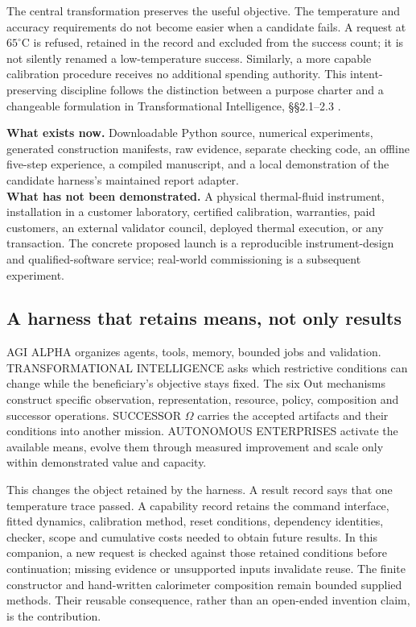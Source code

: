 \documentclass[11pt,letterpaper]{article}
\begin{document}
The central transformation preserves the useful objective. The temperature and accuracy requirements do not become easier when a candidate fails. A request at $65^{\circ}\mathrm C$ is refused, retained in the record and excluded from the success count; it is not silently renamed a low-temperature success. Similarly, a more capable calibration procedure receives no additional spending authority. This intent-preserving discipline follows the distinction between a purpose charter and a changeable formulation in Transformational Intelligence, \S\S2.1--2.3 \cite{transformational}.

\begin{claimbox}
\textbf{What exists now.} Downloadable Python source, numerical experiments, generated construction manifests, raw evidence, separate checking code, an offline five-step experience, a compiled manuscript, and a local demonstration of the candidate harness's maintained report adapter.\\[3pt]
\textbf{What has not been demonstrated.} A physical thermal-fluid instrument, installation in a customer laboratory, certified calibration, warranties, paid customers, an external validator council, deployed thermal execution, or any transaction. The concrete proposed launch is a reproducible instrument-design and qualified-software service; real-world commissioning is a subsequent experiment.
\end{claimbox}

\subsection{A harness that retains means, not only results}
AGI ALPHA organizes agents, tools, memory, bounded jobs and validation. TRANSFORMATIONAL INTELLIGENCE asks which restrictive conditions can change while the beneficiary's objective stays fixed. The six Out mechanisms construct specific observation, representation, resource, policy, composition and successor operations. SUCCESSOR $\Omega$ carries the accepted artifacts and their conditions into another mission. AUTONOMOUS ENTERPRISES activate the available means, evolve them through measured improvement and scale only within demonstrated value and capacity.

This changes the object retained by the harness. A result record says that one temperature trace passed. A capability record retains the command interface, fitted dynamics, calibration method, reset conditions, dependency identities, checker, scope and cumulative costs needed to obtain future results. In this companion, a new request is checked against those retained conditions before continuation; missing evidence or unsupported inputs invalidate reuse. The finite constructor and hand-written calorimeter composition remain bounded supplied methods. Their reusable consequence, rather than an open-ended invention claim, is the contribution.
\end{document}
